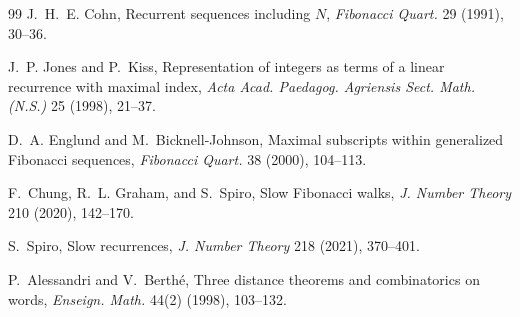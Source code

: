 \documentclass[11pt]{amsart}
\theoremstyle{definition}
\begin{document}
\begin{thebibliography}{99}
 J.~H.~E. Cohn, Recurrent sequences including $N$, \emph{Fibonacci Quart.} 29 (1991), 30--36.

 J.~P. Jones and P.~Kiss, Representation of integers as terms of a linear recurrence with maximal index, \emph{Acta Acad. Paedagog. Agriensis Sect. Math. (N.S.)} 25 (1998), 21--37.

 D.~A. Englund and M.~Bicknell-Johnson, Maximal subscripts within generalized Fibonacci sequences, \emph{Fibonacci Quart.} 38 (2000), 104--113.

 F.~Chung, R.~L. Graham, and S.~Spiro, Slow Fibonacci walks, \emph{J. Number Theory} 210 (2020), 142--170.

 S.~Spiro, Slow recurrences, \emph{J. Number Theory} 218 (2021), 370--401.

 P.~Alessandri and V.~Berth\'e, Three distance theorems and combinatorics on words, \emph{Enseign. Math.} 44(2) (1998), 103--132.

\end{thebibliography}
\end{document}

